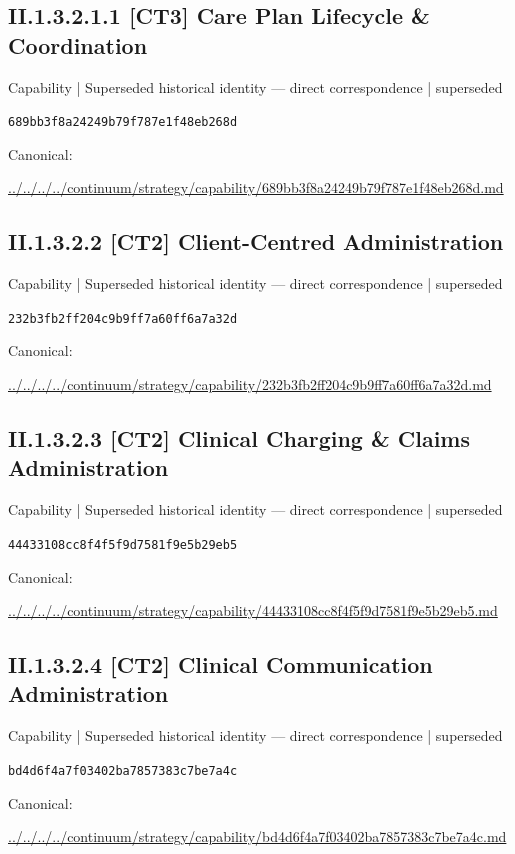 \documentclass[10pt,a4paper]{article}
\begin{document}
\subsection*{II.1.3.2.1.1 [CT3] Care Plan Lifecycle \& Coordination}
{\small Capability | Superseded historical identity — direct correspondence | superseded}\par
\texttt{689bb3f8a24249b79f787e1f48eb268d}\par
Canonical: \par
{\footnotesize\url{../../../../continuum/strategy/capability/689bb3f8a24249b79f787e1f48eb268d.md}}\par
\subsection*{II.1.3.2.2 [CT2] Client-Centred Administration}
{\small Capability | Superseded historical identity — direct correspondence | superseded}\par
\texttt{232b3fb2ff204c9b9ff7a60ff6a7a32d}\par
Canonical: \par
{\footnotesize\url{../../../../continuum/strategy/capability/232b3fb2ff204c9b9ff7a60ff6a7a32d.md}}\par
\subsection*{II.1.3.2.3 [CT2] Clinical Charging \& Claims Administration}
{\small Capability | Superseded historical identity — direct correspondence | superseded}\par
\texttt{44433108cc8f4f5f9d7581f9e5b29eb5}\par
Canonical: \par
{\footnotesize\url{../../../../continuum/strategy/capability/44433108cc8f4f5f9d7581f9e5b29eb5.md}}\par
\subsection*{II.1.3.2.4 [CT2] Clinical Communication Administration}
{\small Capability | Superseded historical identity — direct correspondence | superseded}\par
\texttt{bd4d6f4a7f03402ba7857383c7be7a4c}\par
Canonical: \par
{\footnotesize\url{../../../../continuum/strategy/capability/bd4d6f4a7f03402ba7857383c7be7a4c.md}}\par
\end{document}
